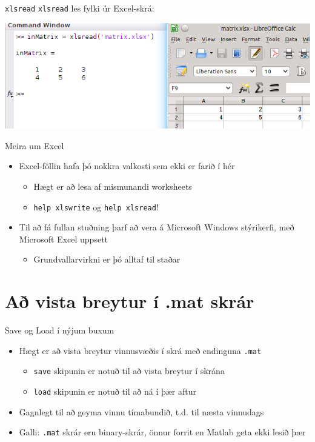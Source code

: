 \documentclass[handout]{beamer}
\begin{document}
\begin{frame}[fragile]{\texttt{xlsread}}
\texttt{xlsread} les fylki úr Excel-skrá:

\includegraphics[width=\textwidth]{Pics/excel}

\end{frame}

\begin{frame}{Meira um Excel}
\begin{itemize}
 \item Excel-föllin hafa þó nokkra valkosti sem ekki er farið í hér
 \begin{itemize}
  \item Hægt er að lesa af mismunandi worksheets
  \item \texttt{help xlswrite} og \texttt{help xlsread}!
 \end{itemize}
 \item Til að fá fullan stuðning þarf að vera á Microsoft Windows stýrikerfi, með Microsoft Excel uppsett
 \begin{itemize}
  \item Grundvallarvirkni er þó alltaf til staðar
 \end{itemize}
\end{itemize}
\end{frame}

\section{Að vista breytur í .mat skrár}

\begin{frame}{Save og Load í nýjum buxum}
\begin{itemize}
 \item Hægt er að vista breytur vinnusvæðis í skrá með endinguna \texttt{.mat}
 \begin{itemize}
  \item \texttt{save} skipunin er notuð til að vista breytur í skrána
  \item \texttt{load} skipunin er notuð til að ná í þær aftur
 \end{itemize}
 \item Gagnlegt til að geyma vinnu tímabundið, t.d. til næsta vinnudags
 \item Galli: \texttt{.mat} skrár eru binary-skrár, önnur forrit en Matlab geta ekki lesið þær
\end{itemize}
\end{frame}
\end{document}
